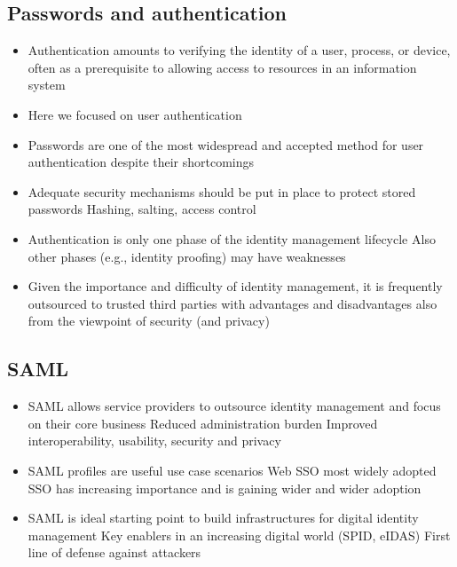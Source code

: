 \documentclass[12pt, a4paper]{article}
\begin{document}
\subsection{Passwords and authentication}
\begin{itemize}
    \item Authentication amounts to verifying the identity of a user, process, or device, often
    as a prerequisite to allowing access to resources in an information system
    \item Here we focused on user authentication
    \item Passwords are one of the most widespread and accepted method for user
    authentication despite their shortcomings
    \item Adequate security mechanisms should be put in place to protect stored passwords
    \subitem Hashing, salting, access control
    \item Authentication is only one phase of the identity management lifecycle
    \subitem Also other phases (e.g., identity proofing) may have weaknesses
    \item Given the importance and difficulty of identity management, it is frequently
    outsourced to trusted third parties with advantages and disadvantages also from
    the viewpoint of security (and privacy)
\end{itemize}
\subsection{SAML}
\begin{itemize}
    \item SAML allows service providers to outsource identity management and focus on
    their core business
    \subitem Reduced administration burden
    \subitem Improved interoperability, usability, security and privacy
    \item SAML profiles are useful use case scenarios
    \subitem Web SSO most widely adopted
    \subitem SSO has increasing importance and is gaining wider and wider adoption
    \item SAML is ideal starting point to build infrastructures for digital identity management
    \subitem Key enablers in an increasing digital world (SPID, eIDAS)
    \subitem First line of defense against attackers
\end{itemize}
\end{document}

